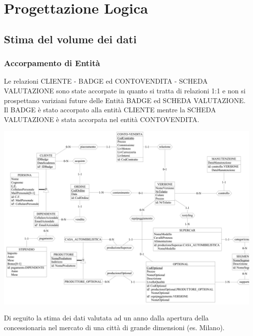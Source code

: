 \documentclass[11pt]{article}
\begin{document}
\newpage

\section{Progettazione Logica}

\subsection{Stima del volume dei dati}

\subsubsection*{Accorpamento di Entità}

Le relazioni CLIENTE - BADGE ed CONTOVENDITA - SCHEDA VALUTAZIONE sono
state accorpate in quanto si tratta di relazioni 1:1 e non si
prospettano variziani future delle Entità BADGE ed SCHEDA
VALUTAZIONE. Il BADGE è stato accorpato alla entità CLIENTE mentre
la SCHEDA VALUTAZIONE è stata accorpata nel entità CONTOVENDITA.

\begin{center}
    \includegraphics[scale=0.48, angle=90]{images/fullSchemes/finalAccorpamenti.png}
\end{center}

Di seguito la stima dei dati valutata ad un anno dalla apertura della
concessionaria nel mercato di una città di grande dimensioni (es. Milano). 
\end{document}
